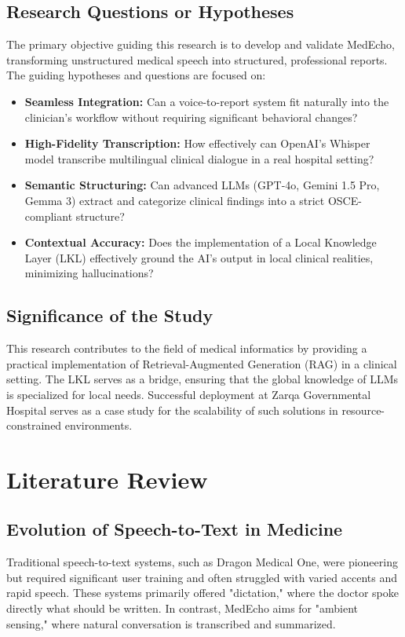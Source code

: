 \documentclass[12pt,a4paper]{article}
\begin{document}
\subsection{Research Questions or Hypotheses}
The primary objective guiding this research is to develop and validate MedEcho, transforming unstructured medical speech into structured, professional reports. The guiding hypotheses and questions are focused on:
\begin{itemize}
    \item \textbf{Seamless Integration:} Can a voice-to-report system fit naturally into the clinician's workflow without requiring significant behavioral changes?
    \item \textbf{High-Fidelity Transcription:} How effectively can OpenAI's Whisper model transcribe multilingual clinical dialogue in a real hospital setting?
    \item \textbf{Semantic Structuring:} Can advanced LLMs (GPT-4o, Gemini 1.5 Pro, Gemma 3) extract and categorize clinical findings into a strict OSCE-compliant structure?
    \item \textbf{Contextual Accuracy:} Does the implementation of a Local Knowledge Layer (LKL) effectively ground the AI's output in local clinical realities, minimizing hallucinations?
\end{itemize}

\subsection{Significance of the Study}
This research contributes to the field of medical informatics by providing a practical implementation of Retrieval-Augmented Generation (RAG) in a clinical setting. The LKL serves as a bridge, ensuring that the global knowledge of LLMs is specialized for local needs. Successful deployment at Zarqa Governmental Hospital serves as a case study for the scalability of such solutions in resource-constrained environments.

\section{Literature Review}

\subsection{Evolution of Speech-to-Text in Medicine}
Traditional speech-to-text systems, such as Dragon Medical One, were pioneering but required significant user training and often struggled with varied accents and rapid speech. These systems primarily offered "dictation," where the doctor spoke directly what should be written. In contrast, MedEcho aims for "ambient sensing," where natural conversation is transcribed and summarized.
\end{document}
